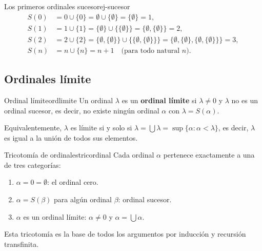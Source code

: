 \begin{ejemplo}{Los primeros ordinales sucesor}{ej-sucesor}
\begin{align*}
  S(0) &= 0 \cup \{0\} = \emptyset \cup \{\emptyset\} = \{\emptyset\} = 1,\\
  S(1) &= 1 \cup \{1\} = \{\emptyset\} \cup \{\{\emptyset\}\} = \{\emptyset, \{\emptyset\}\} = 2,\\
  S(2) &= 2 \cup \{2\} = \{\emptyset, \{\emptyset\}\} \cup \{\{\emptyset, \{\emptyset\}\}\} = \{\emptyset, \{\emptyset\}, \{\emptyset, \{\emptyset\}\}\} = 3,\\
  S(n) &= n \cup \{n\} = n+1 \quad\text{(para todo natural } n\text{)}.
\end{align*}
\end{ejemplo}

\subsection{Ordinales límite}

\begin{definicion}{Ordinal límite}{ordlimite}
Un ordinal $\lambda$ es un \textbf{ordinal límite} si $\lambda \neq 0$ y $\lambda$ no es un ordinal sucesor, es decir, no existe ningún ordinal $\alpha$ con $\lambda = S(\alpha)$.

Equivalentemente, $\lambda$ es límite si y solo si $\lambda = \bigcup \lambda = \sup\{\alpha : \alpha < \lambda\}$, es decir, $\lambda$ es igual a la unión de todos sus elementos.
\end{definicion}

\begin{observacion}{Tricotomía de ordinales}{tricordinal}
Cada ordinal $\alpha$ pertenece exactamente a una de tres categorías:
\begin{enumerate}[leftmargin=2em, label=(\roman*)]
  \item $\alpha = 0 = \emptyset$: el ordinal cero.
  \item $\alpha = S(\beta)$ para algún ordinal $\beta$: ordinal sucesor.
  \item $\alpha$ es un ordinal límite: $\alpha \neq 0$ y $\alpha = \bigcup \alpha$.
\end{enumerate}
Esta tricotomía es la base de todos los argumentos por inducción y recursión transfinita.
\end{observacion}

